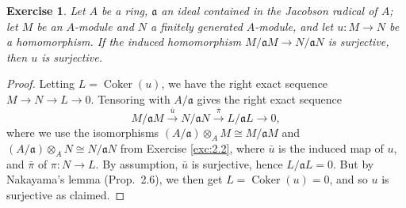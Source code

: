\documentclass[12pt,letterpaper]{article}
\newtheorem{problem}{Exercise}[section]
\theoremstyle{definition}
\theoremstyle{remark}
\numberwithin{figure}{problem}
\numberwithin{equation}{section}
\DeclareMathOperator{\Coker}{Coker}
\begin{document}
\begin{problem}
  Let $A$ be a ring, $\mathfrak{a}$ an ideal contained in the Jacobson radical of $A$; let $M$ be an $A$-module and $N$ a finitely generated $A$-module, and let $u\colon M \to N$ be a homomorphism. If the induced homomorphism $M/\mathfrak{a}M \to N/\mathfrak{a}N$ is surjective, then $u$ is surjective.
\end{problem}
\begin{proof}
  Letting $L = \Coker(u)$, we have the right exact sequence $M \to N \to L \to 0$. Tensoring with $A/\mathfrak{a}$ gives the right exact sequence
  \begin{equation*}
    M/\mathfrak{a}M \overset{\bar{u}}{\longrightarrow} N/\mathfrak{a}N \overset{\bar{\pi}}{\longrightarrow} L/\mathfrak{a}L \longrightarrow 0,
  \end{equation*}
  where we use the isomorphisms $(A/\mathfrak{a}) \otimes_A M \cong M/\mathfrak{a}M$ and $(A/\mathfrak{a}) \otimes_A N \cong N/\mathfrak{a}N$ from Exercise \ref{exc:2.2}, where $\bar{u}$ is the induced map of $u$, and $\bar{\pi}$ of $\pi\colon N \to L$. By assumption, $\bar{u}$ is surjective, hence $L/\mathfrak{a}L = 0$. But by Nakayama's lemma (Prop.~2.6), we then get $L= \Coker(u) = 0$, and so $u$ is surjective as claimed.
\end{proof}
\end{document}
